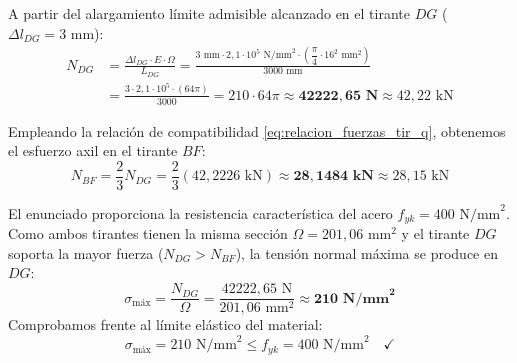 
A partir del alargamiento límite admisible alcanzado en el tirante $DG$ ($\Delta l_{DG} = 3\text{ mm}$):
\begin{align}
    N_{DG} & = \frac{\Delta l_{DG} \cdot E \cdot \Omega}{L_{DG}} = \frac{3\text{ mm} \cdot 2{,}1 \cdot 10^5\text{ N/mm}^2 \cdot \left(\dfrac{\pi}{4} \cdot 16^2\text{ mm}^2\right)}{3000\text{ mm}} \nonumber \\
           & = \frac{3 \cdot 2{,}1 \cdot 10^5 \cdot (64\pi)}{3000} = 210 \cdot 64\pi \approx \mathbf{42222{,}65\text{ N}} \approx \boxed{42{,}22\text{ kN}}
\end{align}

Empleando la relación de compatibilidad \eqref{eq:relacion_fuerzas_tir_q}, obtenemos el esfuerzo axil en el tirante $BF$:
\begin{equation}
    N_{BF} = \frac{2}{3} N_{DG} = \frac{2}{3}(42{,}2226\text{ kN}) \approx \mathbf{28{,}1484\text{ kN}} \approx \boxed{28{,}15\text{ kN}}
\end{equation}


El enunciado proporciona la resistencia característica del acero $f_{yk} = 400\text{ N/mm}^2$. Como ambos tirantes tienen la misma sección $\Omega = 201{,}06\text{ mm}^2$ y el tirante $DG$ soporta la mayor fuerza ($N_{DG} > N_{BF}$), la tensión normal máxima se produce en $DG$:
\begin{equation}
    \sigma_{\text{máx}} = \frac{N_{DG}}{\Omega} = \frac{42222{,}65\text{ N}}{201{,}06\text{ mm}^2} \approx \mathbf{210\text{ N/mm}^2}
\end{equation}
Comprobamos frente al límite elástico del material:
\begin{equation}
    \sigma_{\text{máx}} = 210\text{ N/mm}^2 \leq f_{yk} = 400\text{ N/mm}^2 \quad \checkmark
\end{equation}

